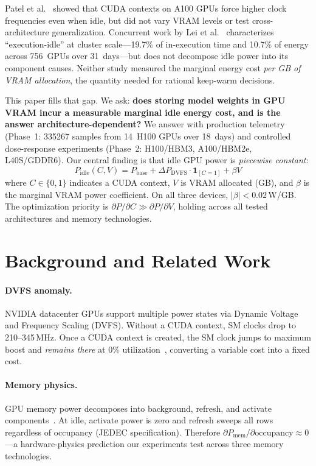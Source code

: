 \documentclass[sigconf,nonacm]{acmart}
\begin{document}
Patel et al.~\cite{patel-cal23} showed that CUDA contexts on A100 GPUs force higher clock frequencies even when idle, but did not vary VRAM levels or test cross-architecture generalization. Concurrent work by Lei et al.~\cite{lei-idle} characterizes ``execution-idle'' at cluster scale---19.7\% of in-execution time and 10.7\% of energy across 756~GPUs over 31~days---but does not decompose idle power into its component causes. Neither study measured the marginal energy cost \emph{per GB of VRAM allocation}, the quantity needed for rational keep-warm decisions.

This paper fills that gap. We ask: \textbf{does storing model weights in GPU VRAM incur a measurable marginal idle energy cost, and is the answer architecture-dependent?} We answer with production telemetry (Phase~1: \num{335267} samples from 14~H100 GPUs over 18~days) and controlled dose-response experiments (Phase~2: H100/HBM3, A100/HBM2e, L40S/GDDR6). Our central finding is that idle GPU power is \emph{piecewise constant}:
\begin{equation}
    P_{\text{idle}}(C, V) = P_{\text{base}} + \Delta P_{\text{DVFS}} \cdot \mathbf{1}_{[C=1]} + \beta V
    \label{eq:model}
\end{equation}
where $C \in \{0,1\}$ indicates a CUDA context, $V$ is VRAM allocated (GB), and $\beta$ is the marginal VRAM power coefficient. On all three devices, $|\beta| < 0.02$\,W/GB. The optimization priority is $\partial P / \partial C \gg \partial P / \partial V$, holding across all tested architectures and memory technologies.

\section{Background and Related Work}

\paragraph{DVFS anomaly.} NVIDIA datacenter GPUs support multiple power states via Dynamic Voltage and Frequency Scaling (DVFS). Without a CUDA context, SM clocks drop to 210--345\,MHz. Once a CUDA context is created, the SM clock jumps to maximum boost and \emph{remains there} at 0\% utilization~\cite{patel-cal23}, converting a variable cost into a fixed cost.

\paragraph{Memory physics.} GPU memory power decomposes into background, refresh, and activate components~\cite{hbm-spec,micron-ddr}. At idle, activate power is zero and refresh sweeps all rows regardless of occupancy (JEDEC specification). Therefore $\partial P_{\text{mem}} / \partial \text{occupancy} \approx 0$---a hardware-physics prediction our experiments test across three memory technologies.
\end{document}

